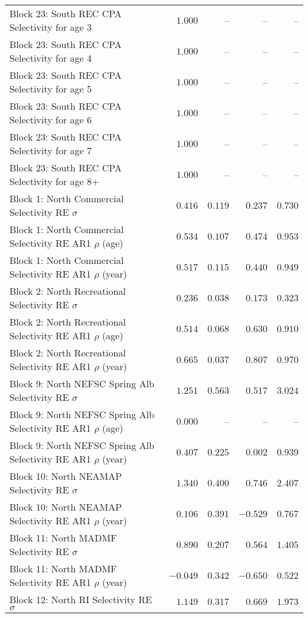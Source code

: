 \documentclass[
]{article}
\begin{document}
\begin{landscape}
\begin{longtable}[t]{lrrrr}
Block 23: South REC CPA Selectivity for age 3 & $1.000$ & -- & -- & --\\
\addlinespace
Block 23: South REC CPA Selectivity for age 4 & $1.000$ & -- & -- & --\\
Block 23: South REC CPA Selectivity for age 5 & $1.000$ & -- & -- & --\\
Block 23: South REC CPA Selectivity for age 6 & $1.000$ & -- & -- & --\\
Block 23: South REC CPA Selectivity for age 7 & $1.000$ & -- & -- & --\\
Block 23: South REC CPA Selectivity for age 8+ & $1.000$ & -- & -- & --\\
\addlinespace
Block 1: North Commercial Selectivity RE $\sigma$ & $0.416$ & $0.119$ & $0.237$ & $0.730$\\
Block 1: North Commercial Selectivity RE AR1 $\rho$ (age) & $0.534$ & $0.107$ & $0.474$ & $0.953$\\
Block 1: North Commercial Selectivity RE AR1 $\rho$ (year) & $0.517$ & $0.115$ & $0.440$ & $0.949$\\
Block 2: North Recreational Selectivity RE $\sigma$ & $0.236$ & $0.038$ & $0.173$ & $0.323$\\
Block 2: North Recreational Selectivity RE AR1 $\rho$ (age) & $0.514$ & $0.068$ & $0.630$ & $0.910$\\
\addlinespace
Block 2: North Recreational Selectivity RE AR1 $\rho$ (year) & $0.665$ & $0.037$ & $0.807$ & $0.970$\\
Block 9: North NEFSC Spring Alb Selectivity RE $\sigma$ & $1.251$ & $0.563$ & $0.517$ & $3.024$\\
Block 9: North NEFSC Spring Alb Selectivity RE AR1 $\rho$ (age) & $0.000$ & -- & -- & --\\
Block 9: North NEFSC Spring Alb Selectivity RE AR1 $\rho$ (year) & $0.407$ & $0.225$ & $0.002$ & $0.939$\\
Block 10: North NEAMAP Selectivity RE $\sigma$ & $1.340$ & $0.400$ & $0.746$ & $2.407$\\
\addlinespace
Block 10: North NEAMAP Selectivity RE AR1 $\rho$ (year) & $0.106$ & $0.391$ & $-0.529$ & $0.767$\\
Block 11: North MADMF Selectivity RE $\sigma$ & $0.890$ & $0.207$ & $0.564$ & $1.405$\\
Block 11: North MADMF Selectivity RE AR1 $\rho$ (year) & $-0.049$ & $0.342$ & $-0.650$ & $0.522$\\
Block 12: North RI Selectivity RE $\sigma$ & $1.149$ & $0.317$ & $0.669$ & $1.973$\\

\end{longtable}
\end{landscape}
\end{document}
